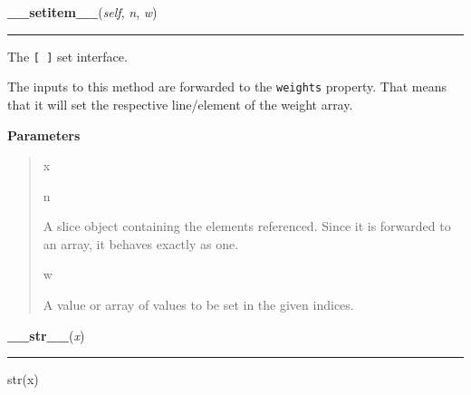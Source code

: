     \begin{boxedminipage}{\textwidth}

    \raggedright \textbf{\_\_setitem\_\_}(\textit{self}, \textit{n}, \textit{w})

    \vspace{-1.5ex}

    \rule{\textwidth}{0.5\fboxrule}

The \texttt{{[} {]}} set interface.

The inputs to this method are forwarded to the \texttt{weights} property.
That means that it will set the respective line/element of the weight
array.
    \vspace{1ex}

      \textbf{Parameters}
      \begin{quote}
        \begin{Ventry}{x}

          \item[n]


A slice object containing the elements referenced. Since it is
forwarded to an array, it behaves exactly as one.
          \item[w]


A value or array of values to be set in the given indices.
        \end{Ventry}

      \end{quote}

    \vspace{1ex}

    \end{boxedminipage}

    \label{object:__str__}

    \vspace{0.5ex}

    \begin{boxedminipage}{\textwidth}

    \raggedright \textbf{\_\_str\_\_}(\textit{x})

    \vspace{-1.5ex}

    \rule{\textwidth}{0.5\fboxrule}

str(x)
    \vspace{1ex}

    \end{boxedminipage}



